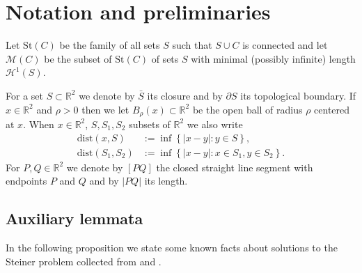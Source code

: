 \documentclass{amsart}
\newcommand{\RR}{\mathbb R}
\renewcommand{\H}{\mathcal H}
\newcommand{\abs}[1]{\left\vert #1 \right\vert}
\newcommand{\ENCLOSE}[1]{\left\{#1\right\}}
\newcommand{\St}{\mathrm{St}}
\newcommand{\M}{\mathcal{M}}
\renewcommand{\H}{\mathcal{H}}
\newcommand{\dist}{\mathrm{dist}}
\newtheorem{conjecture}[theorem]{Conjecture}
\theoremstyle{definition}
\theoremstyle{remark}
\begin{document}
\section{Notation and preliminaries}

Let $\St(C)$ be the family of all sets $S$ such that 
$S\cup C$ is connected and 
let $\M(C)$ be the subset of $\St(C)$ of sets $S$ 
with minimal (possibly infinite) length $\H^1(S)$.

For a set $S\subset \RR^2$ we denote by $\bar S$ 
its closure and by $\partial S$ its topological boundary.
If $x\in \RR^2$ and $\rho>0$ then we let $B_\rho(x)\subset \RR^2$ 
be the open ball of radius 
$\rho$ centered at $x$.
When $x\in \RR^2$, $S,S_1,S_2$ subsets of $\RR^2$
we also write
\begin{align*}
  \dist(x,S)
    &:=\inf\ENCLOSE{\abs{x-y}:y\in S},\\
  \dist(S_1,S_2) 
    &:= \inf\ENCLOSE{\abs{x-y}\colon x\in S_1, y\in S_2}.
\end{align*}
For $P,Q\in \RR^2$ we denote by $[PQ]$ the closed straight line 
segment with endpoints $P$ and $Q$ and by $\abs{PQ}$ its length.

% 
% 

\subsection{Auxiliary lemmata}

In the following proposition we state some known facts about 
solutions to the Steiner problem collected from \cite{PaoSte12}
and \cite{IvaTuz94}.
\end{document}
